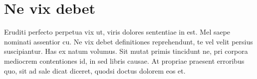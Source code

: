 \section{Ne vix debet}

Eruditi perfecto perpetua vix ut, viris dolores sententiae in est. Mel saepe nominati assentior cu. Ne vix debet definitiones reprehendunt, te vel velit persius suscipiantur. Has ex natum volumus. Sit mutat primis tincidunt ne, pri corpora mediocrem contentiones id, in sed libris causae. At propriae praesent erroribus quo, sit ad sale dicat diceret, quodsi doctus dolorem eos et.
